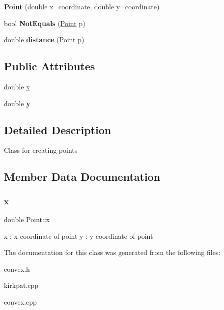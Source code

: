\begin{DoxyCompactItemize}
\mbox{\label{classPoint_a06beb6b0502802fdca6b18311162a130}} 
{\bfseries Point} (double x\+\_\+coordinate, double y\+\_\+coordinate)
\item 
\mbox{\label{classPoint_a586c0e37a501b824a47a03a077220bbb}} 
bool {\bfseries Not\+Equals} (\hyperlink{classPoint}{Point} p)
\item 
\mbox{\label{classPoint_a7dde28996105762fdeba869a0613ce8b}} 
double {\bfseries distance} (\hyperlink{classPoint}{Point} p)
\end{DoxyCompactItemize}
\subsection*{Public Attributes}
\begin{DoxyCompactItemize}
\item 
double \hyperlink{classPoint_ab99c56589bc8ad5fa5071387110a5bc7}{x}
\item 
\mbox{\label{classPoint_afa38be143ae800e6ad69ce8ed4df62d8}} 
double {\bfseries y}
\end{DoxyCompactItemize}


\subsection{Detailed Description}
Class for creating points 

\subsection{Member Data Documentation}
\mbox{\label{classPoint_ab99c56589bc8ad5fa5071387110a5bc7}} 
\subsubsection{\texorpdfstring{x}{x}}
{\footnotesize\ttfamily double Point\+::x}

x \+: x coordinate of point y \+: y coordinate of point 

The documentation for this class was generated from the following files\+:\begin{DoxyCompactItemize}
\item 
convex.\+h\item 
kirkpat.\+cpp\item 
convex.\+cpp\end{DoxyCompactItemize}
